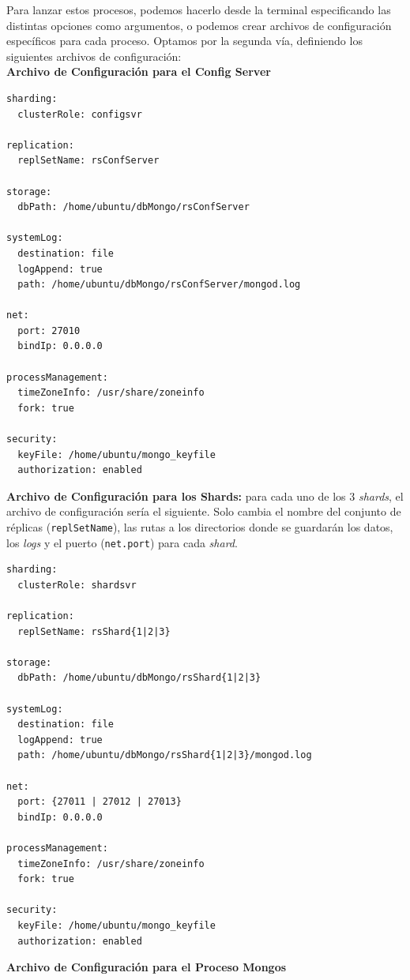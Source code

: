 Para lanzar estos procesos, podemos hacerlo desde la terminal especificando las distintas opciones como argumentos, o podemos crear archivos de configuración específicos para cada proceso. Optamos por la segunda vía, definiendo los siguientes archivos de configuración: \\

\noindent \textbf{Archivo de Configuración para el Config Server}

\begin{verbatim}
sharding:
  clusterRole: configsvr
  
replication:
  replSetName: rsConfServer

storage:
  dbPath: /home/ubuntu/dbMongo/rsConfServer

systemLog:
  destination: file
  logAppend: true
  path: /home/ubuntu/dbMongo/rsConfServer/mongod.log

net:
  port: 27010
  bindIp: 0.0.0.0

processManagement:
  timeZoneInfo: /usr/share/zoneinfo
  fork: true

security:
  keyFile: /home/ubuntu/mongo_keyfile
  authorization: enabled
\end{verbatim}
\newpage 

\noindent \textbf{Archivo de Configuración para los Shards:} para cada uno de los 3 \textit{shards}, el archivo de configuración sería el siguiente. Solo cambia el nombre del conjunto de réplicas (\texttt{replSetName}), las rutas a los directorios donde se guardarán los datos, los \textit{logs} y el puerto (\texttt{net.port}) para cada \textit{shard}.

\begin{verbatim}
sharding:
  clusterRole: shardsvr
  
replication:
  replSetName: rsShard{1|2|3}

storage:
  dbPath: /home/ubuntu/dbMongo/rsShard{1|2|3}

systemLog:
  destination: file
  logAppend: true
  path: /home/ubuntu/dbMongo/rsShard{1|2|3}/mongod.log

net:
  port: {27011 | 27012 | 27013}
  bindIp: 0.0.0.0

processManagement:
  timeZoneInfo: /usr/share/zoneinfo
  fork: true

security:
  keyFile: /home/ubuntu/mongo_keyfile
  authorization: enabled
\end{verbatim}

\noindent \textbf{Archivo de Configuración para el Proceso Mongos} 

